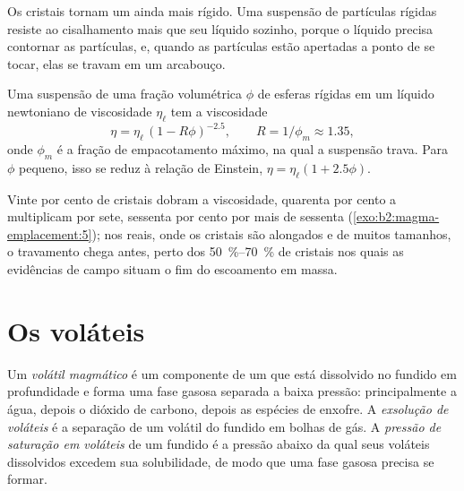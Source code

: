 Os cristais tornam um  ainda mais rígido. Uma suspensão de partículas rígidas resiste
ao cisalhamento mais que seu líquido sozinho, porque o líquido precisa contornar as
partículas, e, quando as partículas estão apertadas a ponto de se tocar, elas se travam em um
arcabouço.

\begin{proposition}\label{prop:b2:magma-emplacement:roscoe}
Uma suspensão de uma fração volumétrica $\phi$ de esferas rígidas em um líquido newtoniano
de viscosidade $\eta_{\ell}$ tem a viscosidade
\[
\eta = \eta_{\ell}\,(1 - R\phi)^{-2.5}, \qquad R = 1/\phi_m \approx 1.35,
\]
onde $\phi_m$ é a fração de empacotamento máximo, na qual a suspensão trava. Para
$\phi$ pequeno, isso se reduz à relação de Einstein, $\eta = \eta_{\ell}(1 + 2.5\phi)$.
\end{proposition}
\admitted

Vinte por cento de cristais dobram a viscosidade, quarenta por cento a multiplicam por
sete, sessenta por cento por mais de sessenta (\cref{exo:b2:magma-emplacement:5}); nos  reais, onde os
cristais são alongados e de muitos tamanhos, o travamento chega antes, perto dos
\qtyrange{50}{70}{\percent} de cristais nos quais as evidências de campo situam o
fim do escoamento em massa.

\section{Os voláteis}

\begin{definition}\label{def:b2:magma-emplacement:volatiles}
Um \emph{volátil magmático} é um componente de um  que
está dissolvido no fundido em profundidade e forma uma fase gasosa separada a baixa
pressão: principalmente a água, depois o dióxido de carbono, depois as espécies de enxofre. A \emph{exsolução
de voláteis} é a separação de um volátil do
fundido em bolhas de gás. A \emph{pressão de saturação
em voláteis} de um fundido é a pressão abaixo da qual
seus voláteis dissolvidos excedem sua solubilidade, de modo que uma fase gasosa precisa se formar.
\end{definition}

